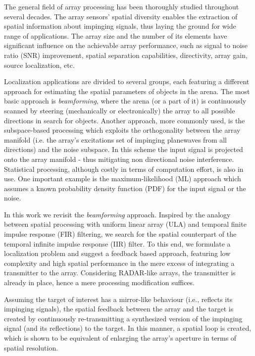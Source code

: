 The general field of array processing has been thoroughly studied throughout several decades.
The array sensors' spatial diversity enables the extraction of spatial information about impinging signals, thus laying the ground for wide range of applications.
The array size and the number of its elements have significant influence on the achievable array performance, such as signal to noise ratio (SNR) improvement, spatial separation capabilities, directivity, array gain, source localization, etc.
\par 
Localization applications are divided to several groups, each featuring a different approach for estimating the spatial parameters of objects in the arena.
The most basic approach is \emph{beamforming}, where the arena (or a part of it) is continuously scanned by steering (mechanically or electronically) the array to all possible directions in search for objects.
Another approach, more commonly used, is the subspace-based processing which exploits the orthogonality between the array manifold (i.e. the array's excitations set of impinging planewaves from all directions) and the noise subspace.
In this scheme the input signal is projected onto the array manifold - thus mitigating non directional noise interference. 
Statistical processing, although costly in terms of computation effort, is also in use.
One important example is the maximum-likelihood (ML) approach which assumes a known probability density function (PDF) for the input signal or the noise.
\par
In this work we revisit the \emph{beamforming} approach.
Inspired by the analogy between spatial processing with uniform linear array (ULA) and temporal finite impulse response (FIR) filtering, we search for the spatial counterpart of the temporal infinite impulse response (IIR) filter.
To this end, we formulate a localization problem and suggest a feedback based approach, featuring low complexity and high spatial performance in the mere excess of integrating a transmitter to the array.
Considering RADAR-like arrays, the transmitter is already in place, hence a mere processing modification suffices.
\par  
Assuming the target of interest has a mirror-like behaviour (i.e., reflects its impinging signals), the spatial feedback between the array and the target is created by continuously re-transmitting a synthesized version of the impinging signal (and its reflections) to the target.
In this manner, a spatial loop is created, which is shown to be equivalent of enlarging the array's aperture in terms of spatial resolution.
